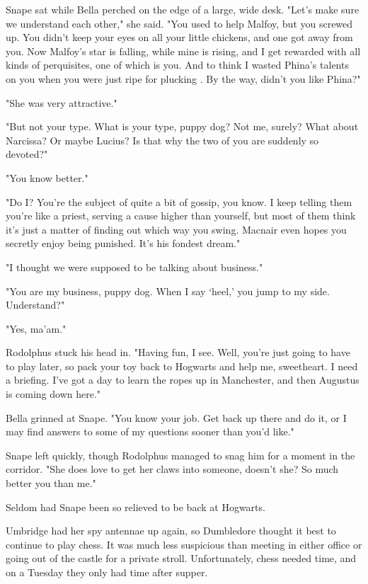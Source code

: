 Snape sat while Bella perched on the edge of a large, wide desk. "Let's make sure we understand each other," she said. "You used to help Malfoy, but you screwed up. You didn't keep your eyes on all your little chickens, and one got away from you. Now Malfoy's star is falling, while mine is rising, and I get rewarded with all kinds of perquisites, one of which is you. And to think I wasted Phina's talents on you when you were just ripe for plucking . By the way, didn't you like Phina?"

"She was very attractive."

"But not your type. What is your type, puppy dog? Not me, surely? What about Narcissa? Or maybe Lucius? Is that why the two of you are suddenly so devoted?"

"You know better."

"Do I? You're the subject of quite a bit of gossip, you know. I keep telling them you're like a priest, serving a cause higher than yourself, but most of them think it's just a matter of finding out which way you swing. Macnair even hopes you secretly enjoy being punished. It's his fondest dream."

"I thought we were supposed to be talking about business."

"You are my business, puppy dog. When I say `heel,' you jump to my side. Understand?"

"Yes, ma'am."

Rodolphus stuck his head in. "Having fun, I see. Well, you're just going to have to play later, so pack your toy back to Hogwarts and help me, sweetheart. I need a briefing. I've got a day to learn the ropes up in Manchester, and then Augustus is coming down here."

Bella grinned at Snape. "You know your job. Get back up there and do it, or I may find answers to some of my questions sooner than you'd like."

Snape left quickly, though Rodolphus managed to snag him for a moment in the corridor. "She does love to get her claws into someone, doesn't she? So much better you than me."

Seldom had Snape been so relieved to be back at Hogwarts.

Umbridge had her spy antennae up again, so Dumbledore thought it best to continue to play chess. It was much less suspicious than meeting in either office or going out of the castle for a private stroll. Unfortunately, chess needed time, and on a Tuesday they only had time after supper.

